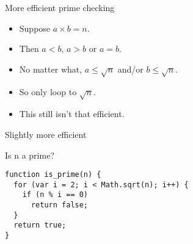 \begin{frame}[fragile]{More efficient prime checking}
  \begin{itemize}
    \item Suppose $a \times b = n$.
    \item Then $a < b$, $a > b$ or $a = b$.
    \item No matter what, $a \le \sqrt{n}$ and/or $b \le \sqrt{n}$.
    \item So only loop to $\sqrt{n}$.
    \item This still isn't that efficient.
  \end{itemize}
\end{frame}

\begin{frame}[fragile]{Slightly more efficient}
  \begin{alertblock}{Is n a prime?}
    \begin{verbatim}
function is_prime(n) {
  for (var i = 2; i < Math.sqrt(n); i++) {
    if (n % i == 0)
      return false;
  }
  return true;
}
    \end{verbatim}
  \end{alertblock}
\end{frame}

